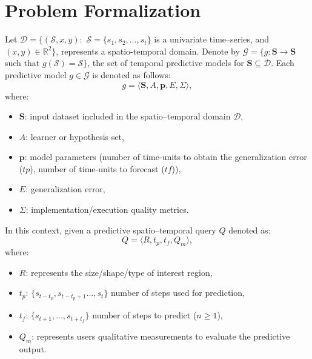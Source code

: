 

\section{Problem Formalization}
\label{Sec:ProblemFormalization}

Let $\mathcal{D} = \{(\mathcal{S}, x, y): \,\, \mathcal{S} = \{s_{1}, s_{2}, \ldots, s_{t}\}$ is a univariate time--series, and $(x,y) \in \mathbb{R}^{2}\}$, represents a spatio-temporal domain. Denote by $\mathcal{G} = \{g: \mathbf{S} \to \mathbf{S}$ such that $g(\mathcal{S}) = \mathcal{S}\}$, the set of temporal predictive models for $\mathbf{S} \subseteq \mathcal{D}$. Each predictive model $g\in \mathcal{G}$ is denoted as follows:
\begin{equation}
\label{eq:ModelDefinition}
g = \langle \mathbf{S}, A, \mathbf{p}, E, \varSigma \rangle,
\end{equation}
where:
\begin{itemize}[noitemsep,nolistsep]	
	\item $\mathbf{S}$: input dataset included in the spatio--temporal domain $\mathcal{D}$,
	\item $A$: learner or hypothesis set,
	\item $\mathbf{p}$: model parameters (number of time-units to obtain the generalization error ($tp$), number of time-units to forecast ($tf$)),
	\item $E$: generalization error,
	\item $\varSigma$: implementation/execution quality metrics.
\end{itemize}

\noindent In this context, given a predictive spatio--temporal query $Q$ denoted as:
\begin{equation} \label{eq:predictivequery}
Q = \langle R, t_{p}, t_{f}, Q_{m} \rangle,
\end{equation}
where:
\begin{itemize}[noitemsep,nolistsep]	
	\item $R$: represents the size/shape/type of interest region,
	\item $t_{p}$: $\{s_{t-t_p}, s_{t-t_{p}+1}\ldots, s_{t}\}$ number of steps used for  prediction,
	\item $t_{f}$: $\{s_{t+1}, \ldots, s_{t+t_f}\}$ number of steps to predict ($n\geq 1$),
	\item $Q_{m}$: represents users qualitative measurements to evaluate the predictive output.
\end{itemize}

